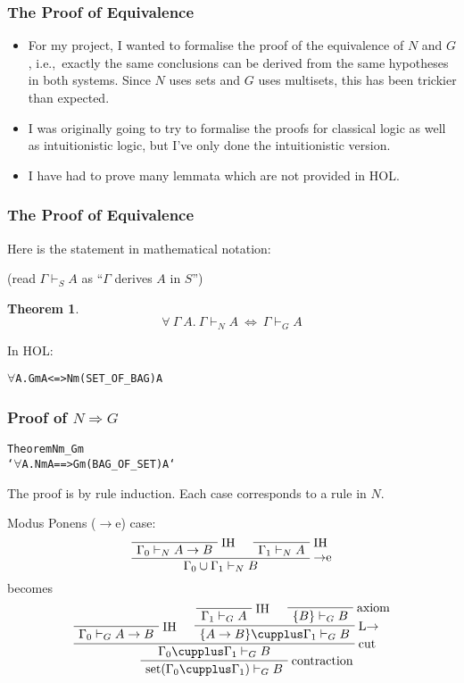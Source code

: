 \documentclass[english,svgnames,hide notes,12pt]{beamer}
\newtheorem{thm}{Theorem}
\theoremstyle{definition}
\theoremstyle{remark}
\begin{document}
\begin{frame}
    \frametitle{The Proof of Equivalence}
    \begin{itemize}
        \item For my project, I wanted to formalise the proof of the equivalence of $N$ and $G$, i.e.,\ exactly the same conclusions can be derived from the same hypotheses in both systems. Since $N$ uses sets and $G$ uses multisets, this has been trickier than expected.
        \item I was originally going to try to formalise the proofs for classical logic as well as intuitionistic logic, but I've only done the intuitionistic version.
        \item I have had to prove many lemmata which are not provided in HOL.
    \end{itemize}
\end{frame}

\begin{frame}[fragile]
    \frametitle{The Proof of Equivalence}
    Here is the statement in mathematical notation:

    (read $\Gamma\vdash_S A$ as ``$\Gamma$ derives $A$ in $S$'')
    \begin{thm}
        \[\forall ~\Gamma ~A. ~\Gamma \vdash_N A ~\Leftrightarrow~ \Gamma \vdash_G A\]
    \end{thm}
    In HOL:

    \begin{alltt}
        \(\forall\) \textGamma A. Gm \textGamma A <=> Nm (SET_OF_BAG \textGamma) A
    \end{alltt}
\end{frame}

\begin{frame}[fragile]
    \frametitle{Proof of $N\Rightarrow G$}
\small
\begin{alltt}
Theorem Nm_Gm
    `\(\forall\) \textGamma A. Nm \textGamma A ==> Gm (BAG_OF_SET \textGamma) A`
\end{alltt}
The proof is by rule induction. Each case corresponds to a rule in $N$.

Modus Ponens ($\to$e) case:
\[
    \AxiomC{}
    \RightLabel{IH}
    \UnaryInfC{$\Gamma_0\vdash_N A\to B$}
    \AxiomC{}
    \RightLabel{IH}
    \UnaryInfC{$\Gamma_1\vdash_N A$}
    \RightLabel{$\to$e}
    \BinaryInfC{$\Gamma_0\cup\Gamma_1 \vdash_N B$}
    \DisplayProof
\]
becomes
\[
    \AxiomC{}
    \RightLabel{IH}
    \UnaryInfC{$\Gamma_0 \vdash_G A \to B$}
    \AxiomC{}
    \RightLabel{IH}
    \UnaryInfC{$\Gamma_1 \vdash_G A$}
    \AxiomC{}
    \RightLabel{axiom}
    \UnaryInfC{$\{B\} \vdash_G B$}
    \RightLabel{L$\to$}
    \BinaryInfC{$\{A\to B\}\cupplus\Gamma_1\vdash_G B$}
    \RightLabel{cut}
    \BinaryInfC{$\Gamma_0\cupplus\Gamma_1\vdash_G B$}
    \RightLabel{contraction}
    \UnaryInfC{$\text{set}(\Gamma_0\cupplus\Gamma_1)\vdash_G B$}
    \DisplayProof
\]

\end{frame}
\end{document}
